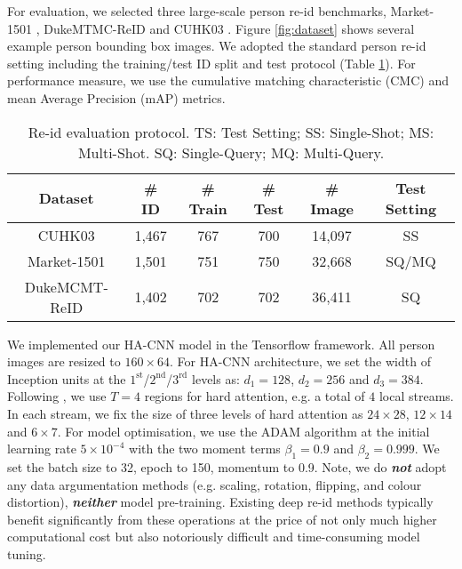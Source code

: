 \documentclass[10pt,twocolumn,letterpaper]{article}
\begin{document}
For evaluation, we selected three large-scale person re-id benchmarks, Market-1501 \cite{wang2016highly}, DukeMTMC-ReID \cite{zheng2017unlabeled} and CUHK03
\cite{li2014deepreid}.
Figure \ref{fig:dataset} shows several example person bounding box images. We adopted the standard person re-id setting
including the training/test ID split and test protocol
(Table \ref{tab:dataset_stats}).
For performance measure, we use
the cumulative matching characteristic (CMC) and mean Average Precision (mAP)
metrics.
\begin{table}[h!] \centering
\renewcommand{\arraystretch}{1.2}
	\setlength{\tabcolsep}{0.003cm}
\caption{Re-id evaluation protocol.
TS: Test Setting;
		SS: Single-Shot; MS: Multi-Shot.
		SQ: Single-Query; MQ: Multi-Query.
	}
\begin{tabular}{|c||c|c|c|c||c|}
		\hline 
		Dataset  & 
{\# ID} & 
		{\# Train } & 
		{\# Test} &
		{\# Image} & 
		Test Setting \\ \hline \hline CUHK03 & 1,467 & 767 & 700 & 14,097  & SS\\
		Market-1501 & 1,501& 751 & 750  & 32,668 & SQ/MQ \\
		DukeMCMT-ReID & 1,402& 702 & 702 & 36,411 & SQ \\
		\hline
	\end{tabular}\label{tab:dataset_stats}
	\vspace{-0.3cm}
\end{table}


We implemented our HA-CNN model in the Tensorflow \cite{abadi2016tensorflow} framework. 
All person images are resized to $160\!\times\! 64$. 
For HA-CNN architecture, we set the width of Inception units 
at the $1^\text{st}$/$2^\text{nd}$/$3^\text{rd}$ levels as:
$d_1\!=\!128$,  $d_2\!=\!256$ and $d_3\!=\!384$.
Following \cite{li2017person}, we use $T\!=\!4$ regions for hard attention,
e.g. a total of $4$ local streams. In each stream, we fix the size of three levels of hard attention as $24\times28$, $12\times14$ and $6\times7$.
For model optimisation,
we use the ADAM \cite{kingma2014adam} algorithm  
at the initial learning rate $5\!\times\!10^{-4}$ with the two moment terms 
$\beta_1=0.9$ and $\beta_2=0.999$.
We set the batch size to 32,
epoch to 150,
momentum to 0.9.
Note, we do {\bf \em not} adopt any data argumentation methods 
(e.g. scaling, rotation, flipping, and colour distortion),
{\bf \em neither} model pre-training.
Existing deep re-id methods typically benefit significantly from these operations
at the price of not only much higher computational cost but also
notoriously difficult and time-consuming model tuning.
\end{document}

